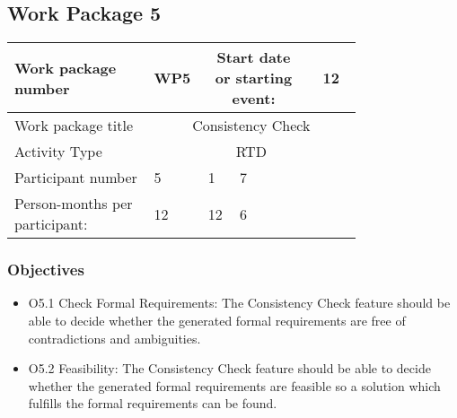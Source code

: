 \subsection{Work Package 5}

\begin{table}[hbpt]\centering
	\begin{tabular}{|p{0.35\linewidth}|p{0.06\linewidth}|p{0.06\linewidth}|p{0.06\linewidth}|
         p{0.06\linewidth}|p{0.06\linewidth}|p{0.06\linewidth}|p{0.06\linewidth}|}\hline
		 Work package number& WP5 &
		 \multicolumn{4}{|c|}{Start date or starting event:}{}&
		 \multicolumn{2}{|c|}{ 12 }{}\\\hline
		 Work package title&\multicolumn{7}{|c|}{ Consistency Check }{}\\\hline
		 Activity Type&\multicolumn{7}{|c|}{ RTD}{}\\\hline
		 Participant number & 5 & 1 & 7 & ~ & ~ & ~ & ~ \\\hline
		 Person-months per participant: & 12 & 12 & 6 & ~ & ~ & ~ & ~ \\\hline
	\end{tabular}
\end{table}

\subsubsection{Objectives}
\begin{itemize}
	\item O5.1 Check Formal Requirements: The Consistency Check feature should be able to decide whether the generated formal requirements are free of contradictions and ambiguities.
	\item O5.2 Feasibility: The Consistency Check feature should be able to decide whether the generated formal requirements are feasible so a solution which fulfills the formal requirements can be found. 
\end{itemize}
